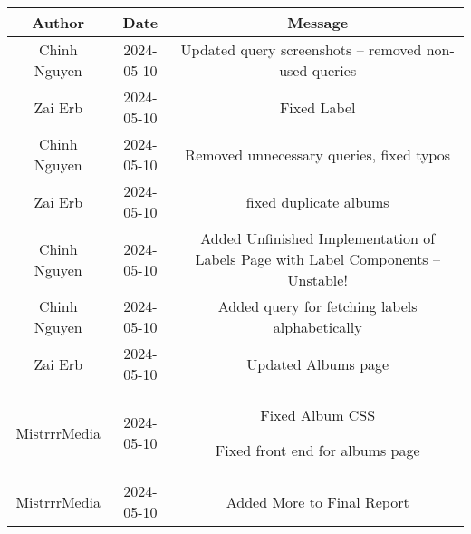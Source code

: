 \begin{tabular}{|c|c|c|}
\hline
Author & Date & Message \\
\hline
Chinh Nguyen & 2024-05-10 & Updated query screenshots -- removed non-used queries \\
Zai Erb & 2024-05-10 & Fixed Label \\
Chinh Nguyen & 2024-05-10 & Removed unnecessary queries, fixed typos \\
Zai Erb & 2024-05-10 & fixed duplicate albums \\
Chinh Nguyen & 2024-05-10 & Added Unfinished Implementation of Labels Page with Label Components -- Unstable! \\
Chinh Nguyen & 2024-05-10 & Added query for fetching labels alphabetically \\
Zai Erb & 2024-05-10 & Updated Albums page \\
MistrrrMedia & 2024-05-10 & Fixed Album CSS

Fixed front end for albums page \\
MistrrrMedia & 2024-05-10 & Added More to Final Report


\end{tabular}
